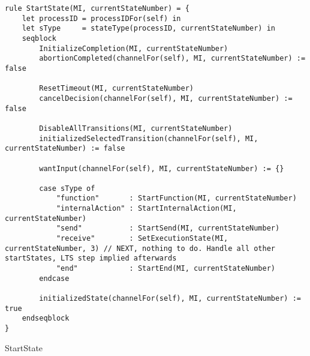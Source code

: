 \begin{listing}[H]
\begin{verbatim}
rule StartState(MI, currentStateNumber) = {
    let processID = processIDFor(self) in
    let sType     = stateType(processID, currentStateNumber) in
    seqblock
        InitializeCompletion(MI, currentStateNumber)
        abortionCompleted(channelFor(self), MI, currentStateNumber) := false

        ResetTimeout(MI, currentStateNumber)
        cancelDecision(channelFor(self), MI, currentStateNumber) := false

        DisableAllTransitions(MI, currentStateNumber)
        initializedSelectedTransition(channelFor(self), MI, currentStateNumber) := false

        wantInput(channelFor(self), MI, currentStateNumber) := {}

        case sType of
            "function"       : StartFunction(MI, currentStateNumber)
            "internalAction" : StartInternalAction(MI, currentStateNumber)
            "send"           : StartSend(MI, currentStateNumber)
            "receive"        : SetExecutionState(MI, currentStateNumber, 3) // NEXT, nothing to do. Handle all other startStates, LTS step implied afterwards
            "end"            : StartEnd(MI, currentStateNumber)
        endcase

        initializedState(channelFor(self), MI, currentStateNumber) := true
    endseqblock
}
\end{verbatim}
\caption{StartState}
\label{lst:asm:StartState}
\end{listing}




